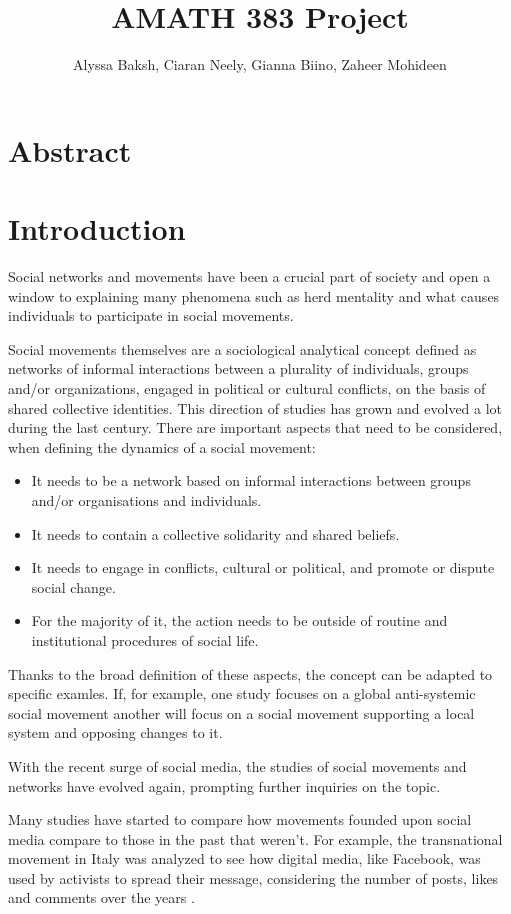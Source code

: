 \documentclass{article}
\title{AMATH 383 Project}
\author{
    Alyssa Baksh, 
    Ciaran Neely,
    Gianna Biino,
    Zaheer Mohideen
}
\begin{document}
    \maketitle
    \section{Abstract}
    \section{Introduction}
    Social networks and movements have been a crucial part of society and open a window to explaining many phenomena such as herd mentality and what causes individuals to participate in social movements\cite{diani_networks_2013}.
    
    Social movements themselves are a sociological analytical concept defined as networks of informal interactions between a plurality of individuals, groups and/or organizations, engaged in political or cultural conflicts, on the basis of shared collective identities. This direction of studies has grown and evolved a lot during the last century. There are important aspects that need to be considered, when defining the dynamics of a social movement: 
    \begin{itemize}
    \item It needs to be a network based on informal interactions between groups and/or organisations and individuals.
    \item It needs to contain a collective solidarity and shared beliefs.
    \item It needs to engage in conflicts, cultural or political, and promote or dispute social change.
    \item  For the majority of it, the action needs to be outside of routine and institutional procedures of social life.
    \end{itemize}
    Thanks to the broad definition of these aspects, the concept can be adapted to specific examles. If, for example, one study focuses on a global anti-systemic social movement another will focus on a social movement supporting a local system and opposing changes to it\cite{diani_concept_1992}.
    
    With the recent surge of social media, the studies of social movements and networks have evolved again, prompting further inquiries on the topic\cite{kumar_structure_2006}.
    
    Many studies have started to compare how movements founded upon social media compare to those in the past that weren't\cite{kidd_social_2016}. For example, the transnational movement in Italy was analyzed to see how digital media, like Facebook, was used by activists to spread their message, considering the number of posts, likes and comments over the  years \cite{pavan_digital_2019}. 
    
\end{document}
